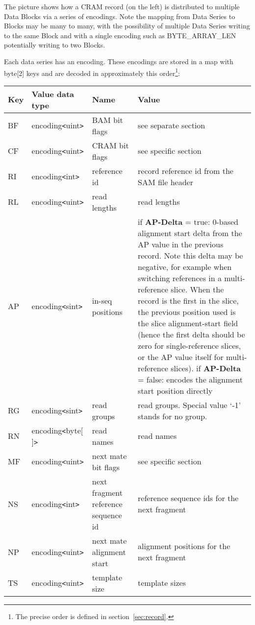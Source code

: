 \documentclass[a4paper]{article}
\begin{document}
The picture shows how a CRAM record (on the left) is distributed to
multiple Data Blocks via a series of encodings.  Note the mapping from
Data Series to Blocks may be many to many, with the possibility of
multiple Data Series writing to the same Block and with a single
encoding such as BYTE\_ARRAY\_LEN potentially writing to two Blocks.


Each data series has an encoding. These encodings are stored in a map with byte[2] 
keys and are decoded in approximately this order\footnote{The precise order is defined in section~\ref{sec:record}.}:

\begin{threeparttable}[t]
\begin{tabular}{|l|l|>{\raggedright}p{100pt}|>{\raggedright}p{220pt}|}
\hline
\textbf{Key} & \textbf{Value data type} & \textbf{Name} & \textbf{Value}\tabularnewline
\hline
BF & encoding\texttt{<}uint\texttt{>} & BAM bit flags & see separate section\tabularnewline
\hline
CF & encoding\texttt{<}uint\texttt{>} & CRAM bit flags & see specific section\tabularnewline
\hline
RI & encoding\texttt{<}int\texttt{>} & reference id & record reference id from
the SAM file header\tabularnewline
\hline
RL & encoding\texttt{<}uint\texttt{>} & read lengths & read lengths\tabularnewline
\hline
AP & encoding\texttt{<}sint\texttt{>} & in-seq positions & if \textbf{AP-Delta} = true: 0-based alignment start
delta from the AP value in the previous record.
Note this delta may be negative, for example when switching references in a multi-reference slice.
When the record is the first in the slice, the previous position used is the slice alignment-start field (hence the first delta should be zero for single-reference slices, or the AP value itself for multi-reference slices).  \linebreak{}
if \textbf{AP-Delta} = false: encodes the alignment start position directly\tabularnewline
\hline
RG & encoding\texttt{<}sint\texttt{>} & read groups & read groups. Special value 
`-1' stands for no group.\tabularnewline
\hline
RN\tnote{a} & encoding\texttt{<}byte[ ]\texttt{>} & read names & read names\tabularnewline
\hline
MF & encoding\texttt{<}uint\texttt{>} & next mate bit flags & see specific section\tabularnewline
\hline
NS & encoding\texttt{<}int\texttt{>} & next fragment reference sequence id & reference 
sequence ids for the next fragment \tabularnewline
\hline
NP & encoding\texttt{<}uint\texttt{>} & next mate alignment start & alignment positions 
for the next fragment\tabularnewline
\hline
TS & encoding\texttt{<}uint\texttt{>} & template size & template sizes\tabularnewline

\end{tabular}
\end{threeparttable}
\end{document}
